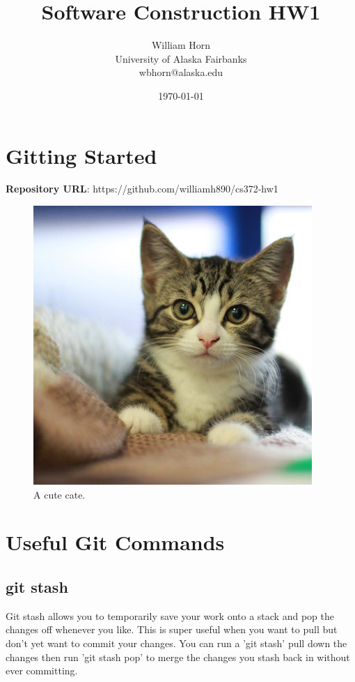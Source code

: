 \documentclass{article}
\begin{document}
\title{Software Construction HW1}
\author{William Horn\\University of Alaska Fairbanks\\wbhorn@alaska.edu}
\date{\today}
\maketitle

\section{Gitting Started}
\textbf{Repository URL}: https://github.com/williamh890/cs372-hw1 \\

\begin{figure}[h!]
  \includegraphics[width=\linewidth]{cat.jpg}
  \caption{A cute cate.}
  \label{fig:cat1}
\end{figure}

\section{Useful Git Commands}
\subsection{git stash}
Git stash allows you to temporarily save your work onto a stack and pop the changes off whenever you like.
This is super useful when you want to pull but don't yet want to commit your changes. You can run a 'git stash' pull
down the changes then run 'git stash pop' to merge the changes you stash back in without ever committing.
\end{document}
